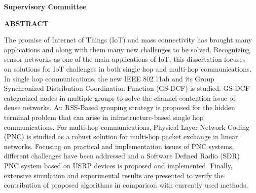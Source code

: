 \newpage
{}

\noindent \textbf{Supervisory Committee}
\tpbreak
\panel

\begin{center}
\textbf{ABSTRACT}
\end{center}

The promise of Internet of Things (IoT) and mass connectivity has brought many applications and along with them many new challenges to be solved. Recognizing sensor networks as one of the main applications of IoT, this dissertation focuses on solutions for IoT challenges in both single hop and multi-hop communications. In single hop communications, the new IEEE 802.11ah and its Group Synchronized Distribution Coordination Function (GS-DCF) is studied. GS-DCF categorized nodes in multiple groups to solve the channel contention issue of dense networks. An RSS-Based grouping strategy is proposed for the hidden terminal problem that can arise in infrastructure-based single hop communications. For multi-hop communications, Physical Layer Network Coding (PNC) is studied as a robust solution for multi-hop packet exchange in linear networks. Focusing on practical and implementation issues of PNC systems, different challenges have been addressed and a Software Defined Radio (SDR) PNC system based on USRP devices is proposed and implemented. Finally, extensive simulation and experimental results are presented to verify the contribution of proposed algorithms in comparison with currently used methods.